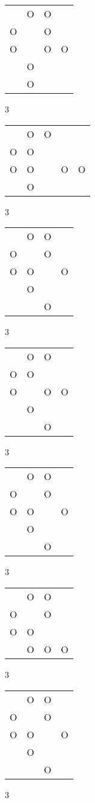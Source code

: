 \begin{tabular}{|m{0.2cm}m{0.2cm}m{0.2cm}m{0.2cm}|}\hline
 &O&O& \\
O& &O& \\
O& &O&O\\
 &O& & \\
 &O& & \\
\hline\end{tabular}3
\begin{tabular}{|m{0.2cm}m{0.2cm}m{0.2cm}m{0.2cm}m{0.2cm}|}\hline
 &O&O& & \\
O&O& & & \\
O&O& &O&O\\
 &O& & & \\
\hline\end{tabular}3
\begin{tabular}{|m{0.2cm}m{0.2cm}m{0.2cm}m{0.2cm}|}\hline
 &O&O& \\
O& &O& \\
O&O& &O\\
 &O& & \\
 & &O& \\
\hline\end{tabular}3
\begin{tabular}{|m{0.2cm}m{0.2cm}m{0.2cm}m{0.2cm}|}\hline
 &O&O& \\
O&O& & \\
O& &O&O\\
 &O& & \\
 & &O& \\
\hline\end{tabular}3
\begin{tabular}{|m{0.2cm}m{0.2cm}m{0.2cm}m{0.2cm}|}\hline
 &O&O& \\
O& &O& \\
O&O& &O\\
 &O& & \\
 & &O& \\
\hline\end{tabular}3
\begin{tabular}{|m{0.2cm}m{0.2cm}m{0.2cm}m{0.2cm}|}\hline
 &O&O& \\
O& &O& \\
O&O& & \\
 &O&O&O\\
\hline\end{tabular}3
\begin{tabular}{|m{0.2cm}m{0.2cm}m{0.2cm}m{0.2cm}|}\hline
 &O&O& \\
O& &O& \\
O&O& &O\\
 &O& & \\
 & &O& \\
\hline\end{tabular}3
